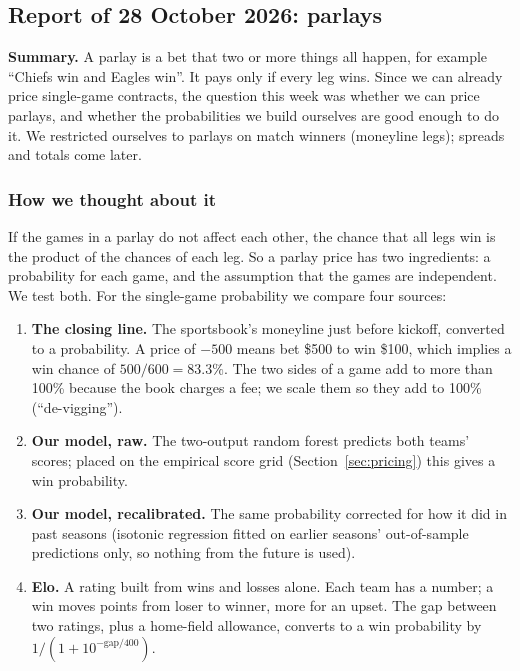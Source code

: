 \subsection{Report of 28 October 2026: parlays}\label{sec:w1028}

\textbf{Summary.} A parlay is a bet that two or more things all happen, for example ``Chiefs win and Eagles win''. It pays only if every leg wins. Since we can already price single-game contracts, the question this week was whether we can price parlays, and whether the probabilities we build ourselves are good enough to do it. We restricted ourselves to parlays on match winners (moneyline legs); spreads and totals come later.

\subsubsection{How we thought about it}

If the games in a parlay do not affect each other, the chance that all legs win is the product of the chances of each leg. So a parlay price has two ingredients: a probability for each game, and the assumption that the games are independent. We test both. For the single-game probability we compare four sources:
\begin{enumerate}[nosep]
\item \textbf{The closing line.} The sportsbook's moneyline just before kickoff, converted to a probability. A price of $-500$ means bet \$500 to win \$100, which implies a win chance of $500/600 = 83.3\%$. The two sides of a game add to more than 100\% because the book charges a fee; we scale them so they add to 100\% (``de-vigging'').
\item \textbf{Our model, raw.} The two-output random forest predicts both teams' scores; placed on the empirical score grid (Section~\ref{sec:pricing}) this gives a win probability.
\item \textbf{Our model, recalibrated.} The same probability corrected for how it did in past seasons (isotonic regression fitted on earlier seasons' out-of-sample predictions only, so nothing from the future is used).
\item \textbf{Elo.} A rating built from wins and losses alone. Each team has a number; a win moves points from loser to winner, more for an upset. The gap between two ratings, plus a home-field allowance, converts to a win probability by $1/(1+10^{-\text{gap}/400})$.
\end{enumerate}

